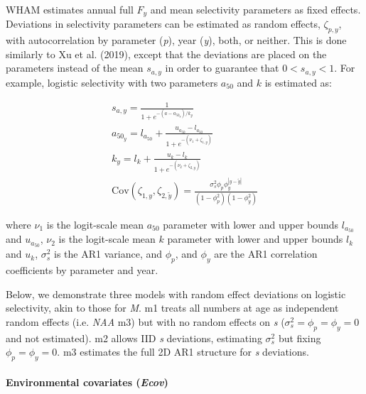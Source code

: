 \documentclass[]{article}
\let\oldparagraph\paragraph
\renewcommand{\paragraph}[1]{\oldparagraph{#1}\mbox{}}
\begin{document}
WHAM estimates annual full \(F_y\) and mean selectivity parameters as
fixed effects. Deviations in selectivity parameters can be estimated as
random effects, \(\zeta_{p,y}\), with autocorrelation by parameter
(\emph{p}), year (\emph{y}), both, or neither. This is done similarly to
Xu et al. (2019), except that the deviations are placed on the
parameters instead of the mean \(s_{a,y}\) in order to guarantee that
\(0 < s_{a,y} < 1\). For example, logistic selectivity with two
parameters \(a_{50}\) and \(k\) is estimated as:

\begin{equation}
  \begin{array}{cccc}
    s_{a,y} = \frac{1}{1 + e^{-(a - a_{{50}_y}) / k_y}} \\
    a_{{50}_y} = l_{a_{50}} + \frac{u_{a_{50}} - l_{a_{50}}}{1 + e^{-(\nu_1 + \zeta_{1,y})}} \\
    k_y = l_k + \frac{u_k - l_k}{1 + e^{-(\nu_2 + \zeta_{2,y})}} \\
    \text{Cov} \left( \zeta_{1,y}, \zeta_{2,\tilde{y}} \right) = \frac{\sigma^2_s \phi_p \phi^{|y-\tilde{y}|}_{y}}{\left(1-\phi^2_{p}\right) \left(1-\phi^2_{y}\right)}
  \end{array}
\end{equation}

where \(\nu_1\) is the logit-scale mean \(a_{50}\) parameter with lower
and upper bounds \(l_{a_{50}}\) and \(u_{a_{50}}\), \(\nu_2\) is the
logit-scale mean \(k\) parameter with lower and upper bounds \(l_k\) and
\(u_k\), \(\sigma^2_s\) is the AR1 variance, and \(\phi_p\), and
\(\phi_y\) are the AR1 correlation coefficients by parameter and year.

Below, we demonstrate three models with random effect deviations on
logistic selectivity, akin to those for \emph{M}. m1 treats all numbers
at age as independent random effects (i.e. \emph{NAA} m3) but with no
random effects on \emph{s} (\(\sigma^2_s = \phi_p = \phi_y = 0\) and not
estimated). m2 allows IID \emph{s} deviations, estimating \(\sigma^2_s\)
but fixing \(\phi_p = \phi_y = 0\). m3 estimates the full 2D AR1
structure for \emph{s} deviations.

\hypertarget{environmental-covariates-ecov}{%
\paragraph{\texorpdfstring{Environmental covariates
(\emph{Ecov})}{Environmental covariates (Ecov)}}\label{environmental-covariates-ecov}}
\end{document}
